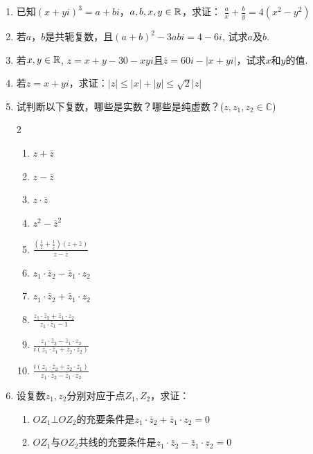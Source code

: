 \begin{enumerate}
\item 已知$(x+yi)^3=a+bi$，$a,b,x,y\in\mathbb{R}$，求证：
$\frac{a}{x}+\frac{b}{y}=4(x^2-y^2)$

\item 若$a$，$b$是共轭复数，且$(a+b)^2-3abi=4-6i$, 试求$a$及$b$.
\item 若$x,y\in\mathbb{R}$, $z=x+y-30-xyi$且$\bar z=60i-|x+yi|$，试求$x$和$y$的值.
\item 若$z=x+yi$，求证：$|z|\le |x|+|y|\le \sqrt{2}|z|$
\item 试判断以下复数，哪些是实数？哪些是纯虚数？($z,z_1,z_2\in\mathbb{C}$)
\begin{multicols}{2}
\begin{enumerate}[(1)]
    \item $z+\bar z$
    \item $z-\bar z$
    \item $z\cdot \bar z$
    \item $z^2-\bar z^2$
    \item $\frac{\left(\frac{1}{z}+\frac{1}{\bar z}\right)(z+\bar z)}{z-\bar z}$
    \item $z_1\cdot \bar z_2-\bar z_1\cdot z_2$
    \item $z_1\cdot \bar z_2+\bar z_1\cdot z_2$
    \item $\frac{z_1\cdot \bar z_2+\bar z_1\cdot z_2}{z_1\cdot \bar z_1-1}$
    \item $\frac{z_1\cdot \bar z_2-\bar z_1\cdot z_2}{i(z_1\cdot \bar z_1+z_2\cdot \bar z_2)}$
    \item $\frac{i(z_1\cdot \bar z_2+z_2\cdot \bar z_1)}{z_1\cdot \bar z_2-\bar z_1\cdot z_2}$
\end{enumerate}
\end{multicols}

\item 设复数$z_1,z_2$分别对应于点$Z_1,Z_2$，求证：
\begin{enumerate}[(1)]
    \item $OZ_1\bot OZ_2$的充要条件是$z_1\cdot \bar z_2+\bar z_1\cdot z_2=0$
    \item $OZ_1$与$OZ_2$共线的充要条件是$z_1\cdot \bar z_2-\bar z_1\cdot z_2=0$
\end{enumerate}


\end{enumerate}
